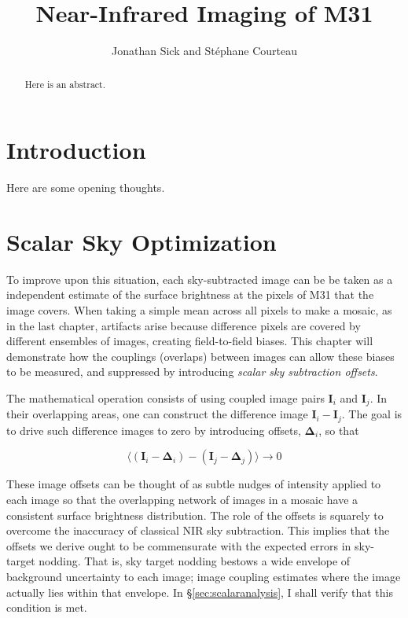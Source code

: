 \documentclass[iop]{emulateapj}
\newcommand{\vect}[1]{\boldsymbol{#1}} %
\begin{document}
\title{Near-Infrared Imaging of M31}
\author{Jonathan Sick and Stéphane Courteau}

\begin{abstract}
Here is an abstract.
\end{abstract}

\section{Introduction}

Here are some opening thoughts.

\section{Scalar Sky Optimization} %
\label{sec:scalarsky}

To improve upon this situation, each sky-subtracted image can be be taken as a independent estimate of the surface brightness at the pixels of M31 that the image covers. When taking a simple mean across all pixels to make a mosaic, as in the last chapter, artifacts arise because difference pixels are covered by different ensembles of images, creating field-to-field biases. This chapter will demonstrate how the couplings (overlaps) between images can allow these biases to be measured, and suppressed by introducing \emph{scalar sky subtraction offsets}.

The mathematical operation consists of using coupled image pairs $\vect{I}_i$ and $\vect{I}_j$. In their overlapping areas, one can construct the difference image $\vect{I}_i - \vect{I}_j$.
The goal is to drive such difference images to zero by introducing offsets, $\vect{\Delta}_i$, so that

\begin{equation}
    \langle (\vect{I}_i-\vect{\Delta}_i) - (\vect{I}_j-\vect{\Delta}_j) \rangle \rightarrow 0
    \label{eq:offsettheory}
\end{equation}

These image offsets can be thought of as subtle nudges of intensity applied to each image so that the overlapping network of images in a mosaic have a consistent surface brightness distribution. The role of the offsets is squarely to overcome the inaccuracy of classical NIR sky subtraction. This implies that the offsets we derive ought to be commensurate with the expected errors in sky-target nodding. That is, sky target nodding bestows a wide envelope of background uncertainty to each image; image coupling estimates where the image actually lies within that envelope. In \S \ref{sec:scalaranalysis}, I shall verify that this condition is met.
\end{document}
